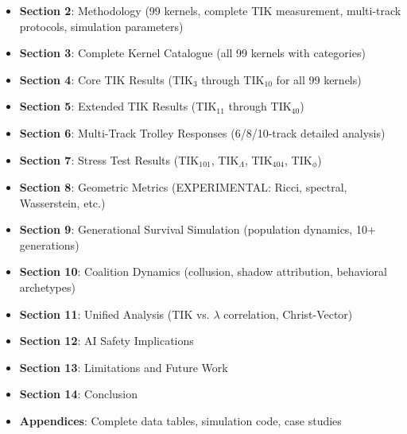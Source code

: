 \documentclass[11pt,a4paper]{article}
\theoremstyle{definition}
\theoremstyle{remark}
\begin{document}
\begin{itemize}
    \item \textbf{Section 2}: Methodology (99 kernels, complete TIK measurement, multi-track protocols, simulation parameters)
    \item \textbf{Section 3}: Complete Kernel Catalogue (all 99 kernels with categories)
    \item \textbf{Section 4}: Core TIK Results (TIK$_3$ through TIK$_{10}$ for all 99 kernels)
    \item \textbf{Section 5}: Extended TIK Results (TIK$_{11}$ through TIK$_{40}$)
    \item \textbf{Section 6}: Multi-Track Trolley Responses (6/8/10-track detailed analysis)
    \item \textbf{Section 7}: Stress Test Results (TIK$_{101}$, TIK$_\Lambda$, TIK$_{404}$, TIK$_\phi$)
    \item \textbf{Section 8}: Geometric Metrics (EXPERIMENTAL: Ricci, spectral, Wasserstein, etc.)
    \item \textbf{Section 9}: Generational Survival Simulation (population dynamics, 10+ generations)
    \item \textbf{Section 10}: Coalition Dynamics (collusion, shadow attribution, behavioral archetypes)
    \item \textbf{Section 11}: Unified Analysis (TIK vs. $\lambda$ correlation, Christ-Vector)
    \item \textbf{Section 12}: AI Safety Implications
    \item \textbf{Section 13}: Limitations and Future Work
    \item \textbf{Section 14}: Conclusion
    \item \textbf{Appendices}: Complete data tables, simulation code, case studies
\end{itemize}

\begin{center}
\end{center}
\end{document}
